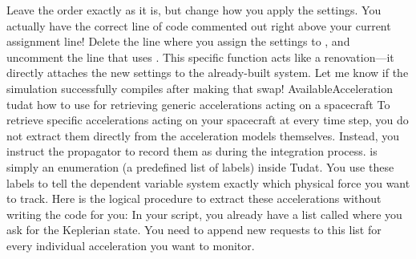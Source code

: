 {} Leave the order exactly as it is, but change how you apply the settings. You actually have the correct line of code commented out right above your current assignment line! Delete the line where you assign the settings to , and uncomment the line that uses . This specific function acts like a renovation—it directly attaches the new settings to the already-built  system.\markdownRendererInterblockSeparator
{}Let me know if the simulation successfully compiles after making that swap!\markdownRendererInterblockSeparator
{}\markdownRendererThematicBreak{}\markdownRendererInterblockSeparator
{}
\markdownRendererSectionEnd 
\markdownRendererSectionEnd \markdownRendererSectionBegin
{}\markdownRendererInterblockSeparator
{}AvailableAcceleration tudat how to use for retrieving generic accelerations acting on a spacecraft\markdownRendererInterblockSeparator
{}
\markdownRendererSectionEnd \markdownRendererSectionBegin
{}\markdownRendererInterblockSeparator
{}To retrieve specific accelerations acting on your spacecraft at every time step, you do not extract them directly from the acceleration models themselves. Instead, you instruct the propagator to record them as  during the integration process.\markdownRendererInterblockSeparator
{} is simply an enumeration (a predefined list of labels) inside Tudat. You use these labels to tell the dependent variable system exactly which physical force you want to track.\markdownRendererInterblockSeparator
{}Here is the logical procedure to extract these accelerations without writing the code for you:\markdownRendererInterblockSeparator
{}\markdownRendererSectionBegin
{}\markdownRendererInterblockSeparator
{}In your script, you already have a list called  where you ask for the Keplerian state. You need to append new requests to this list for every individual acceleration you want to monitor.\markdownRendererInterblockSeparator
